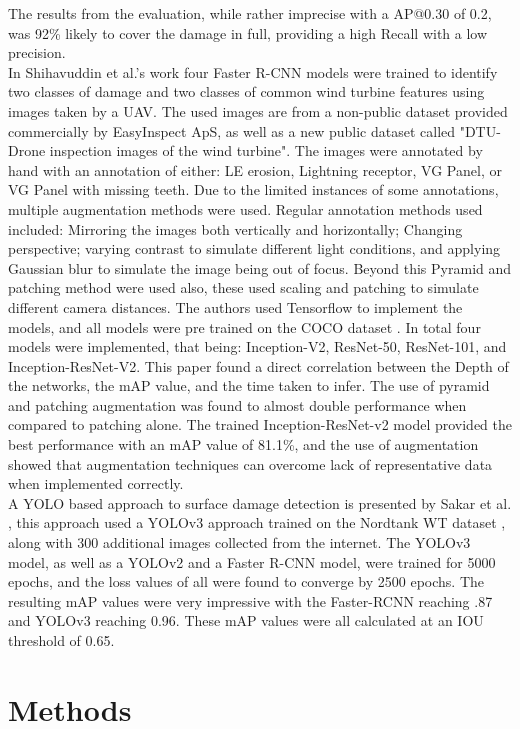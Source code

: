 \documentclass[conference]{IEEEtran}
\begin{document}
The results from the evaluation, while rather imprecise with a AP@0.30 of 0.2, was 92\% likely to cover the damage in full, providing a high Recall with a low precision.\\
In Shihavuddin et al.'s work \cite{shihavuddin2019wind} four Faster R-CNN models were trained to identify two classes of damage and two classes of common wind turbine features using images taken by a UAV. The used images are from a non-public dataset provided commercially by EasyInspect ApS, as well as a new public dataset called "DTU-Drone inspection images of the wind turbine"\cite{DTU}. The images were annotated by hand with an annotation of either: LE erosion, Lightning receptor, VG Panel, or VG Panel with missing teeth. Due to the limited instances of some annotations, multiple augmentation methods were used. Regular annotation methods used included: Mirroring the images both vertically and horizontally; Changing perspective; varying contrast to simulate different light conditions, and applying Gaussian blur to simulate the image being out of focus. Beyond this Pyramid and patching method were used also, these used scaling and patching to simulate different camera distances. The authors used Tensorflow to implement the models, and all models were pre trained on the COCO dataset \cite{lin2015microsoft}. In total four models were implemented, that being: Inception-V2, ResNet-50, ResNet-101, and Inception-ResNet-V2. This paper found a direct correlation between the Depth of the networks, the mAP value, and the time taken to infer. The use of pyramid and patching augmentation was found to almost double performance when compared to patching alone. The trained Inception-ResNet-v2 model provided the best performance with an mAP value of 81.1\%, and the use of augmentation showed that augmentation techniques can overcome lack of representative data when implemented correctly.
\\ A YOLO based approach to surface damage detection is presented by Sakar et al. \cite{sarkar2021wind}, this approach used a YOLOv3 approach trained on the Nordtank WT dataset \cite{DTU}, along with 300 additional images collected from the internet. The YOLOv3 model, as well as a YOLOv2 and a Faster R-CNN model, were trained for 5000 epochs, and the loss values of all were found to converge by 2500 epochs. The resulting mAP values were very impressive with the Faster-RCNN reaching .87 and YOLOv3 reaching 0.96. These mAP values were all calculated at an IOU threshold of 0.65. 


\section{Methods}
\end{document}
